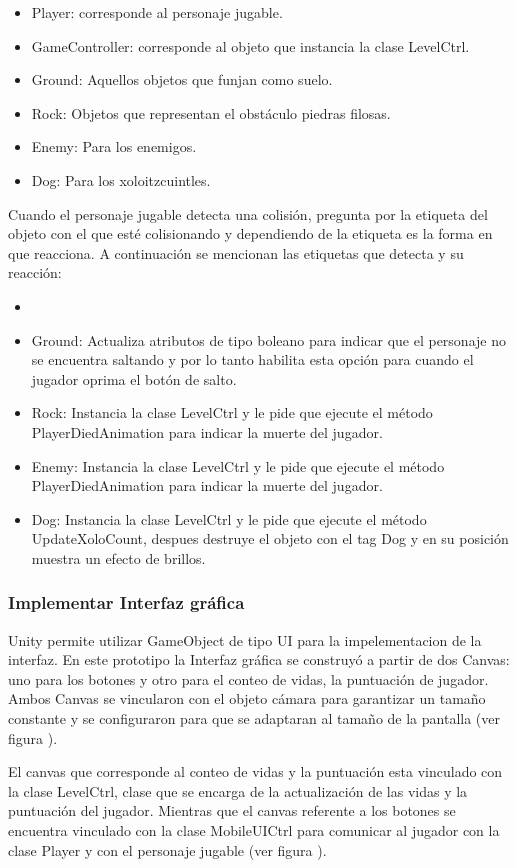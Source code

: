 \begin{itemize}
	\item Player: corresponde al personaje jugable.
	\item GameController: corresponde al objeto que instancia la clase LevelCtrl.
	\item Ground: Aquellos objetos que funjan como suelo.
	\item Rock: Objetos que representan el obstáculo piedras filosas.
	\item Enemy: Para los enemigos.
	\item Dog: Para los xoloitzcuintles.
\end{itemize}   
Cuando el personaje jugable detecta una colisión, pregunta por la etiqueta del 
objeto con el que esté colisionando y dependiendo de la etiqueta es la forma 
en que reacciona. A continuación se mencionan las etiquetas que detecta y su 
reacción:
\begin{itemize}
	\item \item Ground: Actualiza atributos de tipo boleano para indicar que el 
	personaje no se encuentra saltando y por lo tanto habilita esta opción para 
	cuando el jugador oprima el botón de salto.
	\item Rock: Instancia la clase LevelCtrl y le pide que ejecute el método 
	PlayerDiedAnimation para indicar la muerte del jugador.
	\item Enemy: Instancia la clase LevelCtrl y le pide que ejecute el método 
	PlayerDiedAnimation para indicar la muerte del jugador.
	\item Dog: Instancia la clase LevelCtrl y le pide que ejecute el método 
	UpdateXoloCount, despues destruye el objeto con el tag Dog y en su posición 
	muestra un efecto de brillos. 
\end{itemize} 

\subsubsection{Implementar Interfaz gráfica} 
Unity permite utilizar GameObject de tipo UI para la impelementacion de la interfaz.
En este prototipo la Interfaz gráfica se construyó a partir de dos Canvas: uno 
para los botones y otro para el conteo de vidas, la puntuación de jugador. 
Ambos Canvas se vincularon con el objeto cámara para garantizar un tamaño constante 
y se configuraron para que se adaptaran al tamaño de la pantalla (ver figura ).    
 \\
 \par
 El canvas que corresponde al conteo de vidas y la puntuación esta vinculado con 
 la clase LevelCtrl, clase que se encarga de la actualización de las vidas y la 
 puntuación del jugador. Mientras que el canvas referente a los botones se encuentra 
 vinculado con la clase MobileUICtrl para comunicar al jugador con la clase Player 
 y con el personaje jugable (ver figura ).  
 
